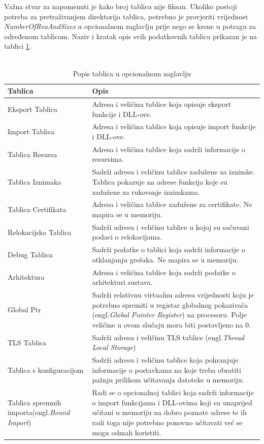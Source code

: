 \documentclass[times, utf8, diplomski, numeric]{fer}
\begin{document}
Važna stvar za napomenuti je kako broj tablica nije fiksan. Ukoliko postoji potreba za pretraživanjem direktorija tablica, potrebno je provjeriti vrijednost \emph{NumberOfRvaAndSizes} u opcionalnom zaglavlju prije nego se krene u potragu za određenom tablicom. Naziv i kratak opis svih podatkovnih tablica prikazan je na tablici \ref{tbl:imgDataDir}.
\\
\\
{\small
\begin{longtable}{|l|p{6cm}|}
\caption{Popis tablica u opcionalnom zaglavlju} \label{tbl:imgDataDir} \\
\hline
Tablica & Opis \\ \hline
Eksport Tablica & Adresa i veličina tablice koja opisuje eksport funkcije i DLL-ove. \\ \hline
Import Tablica &  Adresa i veličina tablice koja opisuje import funkcije i DLL-ove. \\ \hline
Tablica Resursa & Adresa i veličina tablice koja sadrži informacije o resursima. \\ \hline
Tablica Iznimaka & Sadrži adresu i veličinu tablice zadužene za iznimke. Tablica pokazuje na adrese funkcija koje su zadužene za rukovanje iznimkama. \\ \hline
Tablica Certifikata & Adresa i veličina tablice zadužene za certifikate. Ne mapira se u memoriju. \\ \hline
Relokacijska Tablica & Sadrži adresu i veličinu tablice u kojoj su sačuvani podaci o relokacijama. \\ \hline
Debug Tablica & Sadrži podatke o tablici koja sadrži informacije o otklanjanju grešaka. Ne mapira se u memoriju. \\ \hline
Arhitektura & Adresa i veličina tablice koja sadrži podatke o arhitekturi sustava. \\ \hline
Global Ptr & Sadrži relativnu virtualnu adresu vrijednosti koju je potrebno spremiti u registar globalnog pokazivača (engl.\emph{Global Pointer Register}) na procesoru. Polje veličine u ovom slučaju mora biti postavljeno na 0. \\ \hline
TLS Tablica & Sadrži adresu i veličinu TLS tablice (engl.\emph{Thread Local Storage}) \\ \hline
Tablica s konfiguracijom & Sadrži adresu i veličinu tablice koja pohranjuje informacije o postavkama na koje treba obratiti pažnju prilikom učitavanja datoteke u memoriju. \\ \hline
Tablica spremnih importa(engl.\emph{Bound Import}) & Radi se o opcionalnoj tablici koja sadrži informacije o import funkcijama i DLL-ovima koji su unaprijed učitani u memoriju na dobro poznate adrese te ih radi toga nije potrebno ponovno učitavati već se mogu odmah koristiti. \\ \hline

\end{longtable}}
\end{document}
